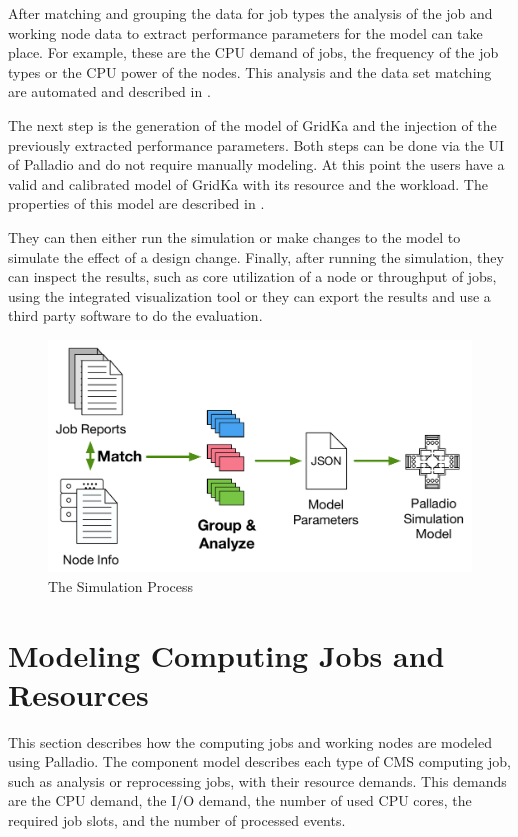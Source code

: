 \documentclass[a4paper]{jpconf}
\begin{document}
After matching and grouping the data for job types the analysis of the job and working node data to extract performance parameters for the model can take place. For example, these are the CPU demand of jobs, the frequency of the job types or the CPU power of the nodes. This analysis and the data set matching are automated and described in .

The next step is the generation of the model of GridKa and the injection of the previously extracted performance parameters. Both steps can be done via the UI of Palladio and do not require manually modeling. At this point the users have a valid and calibrated model of GridKa with its resource and the workload. The properties of this model are described in .

They can then either run the simulation or make changes to the model to simulate the effect of a design change. 
Finally, after running the simulation, they can inspect the results, such as core utilization of a node or throughput of jobs, using the integrated visualization tool or they can export the results and use a third party software to do the evaluation.

\begin{figure}
	\centering
	\includegraphics[scale = 0.4]{images/process}
	\caption[]{The Simulation Process}
	\label{process}
\end{figure}


\section{Modeling Computing Jobs and Resources}
\label{sec:model}
This section describes how the computing jobs and working nodes are modeled using Palladio.
The component model describes each type of CMS computing job, such as analysis or reprocessing jobs, with their resource demands. This demands are the CPU demand, the I/O demand, the number of used CPU cores, the required job slots, and the number of processed events.
\end{document}
